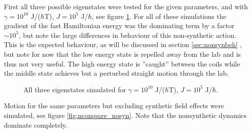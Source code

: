 \documentclass[main.tex]{subfiles}
\begin{document}
First all three possible eigenstates were tested for the given parameters, and with
\(\gamma = 10^{10}\) J/(\(\hbar{}\)T), \(J = 10^5\) J/\(\hbar{}\), see figure
\ref{fig:ncompare}. For all of these simulations the gradient of the fast Hamiltonian
energy was the dominating term by a factor \(\sim 10^{5}\), but note the large differences
in behaviour of this non-synthetic action. This is the expected behaviour, as will be discussed in
section \ref{sec:nonsynbeh}
, but note for now that the low energy state is repelled away from the lab and is thus not
very useful. The high energy state is ''caught'' between the coils while the middle state
achieves but a perturbed straight motion through the lab.
\begin{figure}[h]
    \centering
    \qquad
    \qquad
    \caption{\centering All three eigenstates simulated for \(\gamma = 10^{10}\)
            J/(\(\hbar{}\)T), \(J = 10^5\)
    J/\(\hbar{}\).}%
    \label{fig:ncompare}
\end{figure}
Motion for the same parameters but excluding synthetic field effects were simulated, see
figure \ref{fig:ncompare_nosyn}. Note that the nonsynthetic dynamics dominate completely.
\end{document}

